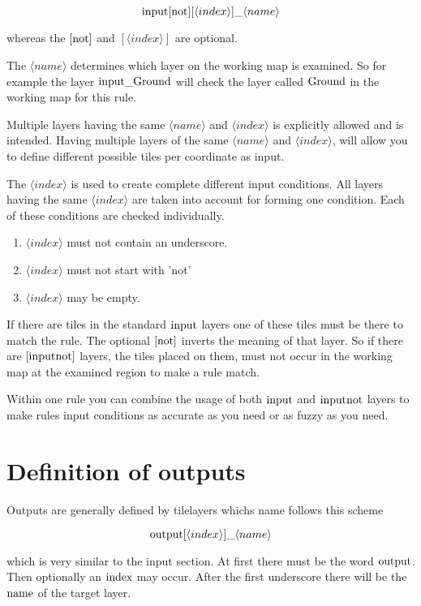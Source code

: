 \documentclass[dvips, a4paper, 12pt,listof=totoc, oneside, parskip]{scrbook}
\begin{document}
$$\textup{input}[\textup{not}] [\langle index \rangle]  \_ \langle name \rangle$$

whereas the $[\textup{not}]$ and $[\langle index \rangle]$ are optional.

The $\langle name \rangle$ determines which layer on the working map is examined.
So for example the layer $\textup{input}\_\textup{Ground}$ will check the
layer called $\textup{Ground}$ in the working map for this rule.

Multiple layers having the same $\langle name \rangle$ and $\langle index \rangle$
is explicitly allowed and is intended. Having multiple layers of the same
$\langle name \rangle$ and $\langle index \rangle$, will allow you to define different possible tiles
per coordinate as input.

The $\langle index \rangle$ is used to create complete different input conditions.
All layers having the same $\langle index \rangle$ are taken into account for forming one
condition. Each of these conditions are checked individually.

\begin{enumerate}
  \item $\langle index \rangle$ must not contain an underscore.
  \item $\langle index \rangle$ must not start with 'not'
  \item $\langle index \rangle$ may be empty.
\end{enumerate}

If there are tiles in the standard $\textup{input}$ layers one of these tiles must be
there to match the rule. The optional $[\textup{not}]$ inverts the meaning of that layer.
So if there are $[\textup{inputnot}]$ layers, the tiles placed on them, must not
occur in the working map at the examined region to make a rule match.

Within one rule you can combine the usage of both $\textup{input}$ and $\textup{inputnot}$
layers to make rules input conditions as accurate as you need or as fuzzy
as you need.


\section{Definition of outputs}

Outputs are generally defined by tilelayers whichs name follows this scheme

$$\textup{output}[\langle index \rangle]  \_ \langle name \rangle$$

which is very similar to the input section. At first there must be the word $\textup{output}$.
Then optionally an $\textup{index}$ may occur. After the first underscore there will be the
$\textup{name}$ of the target layer.
\end{document}
